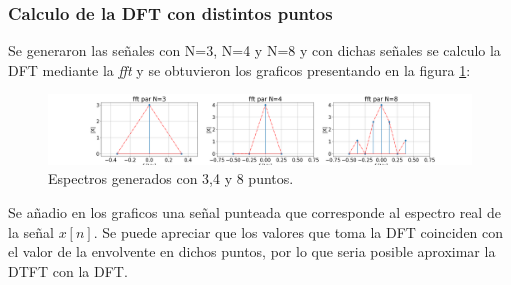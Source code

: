 \documentclass[letterpaper]{article}
\begin{document}
    
\subsubsection{Calculo de la DFT con distintos puntos}    
Se generaron las señales con N=3, N=4 y N=8 y con dichas señales se calculo la DFT mediante la \textit{fft} y se obtuvieron los graficos presentando en la figura \ref{fig.3b}:

\begin{figure}[htb]
\centering
\includegraphics[width=\textwidth]{Img/punto_3_b.png}
\caption{Espectros generados con 3,4 y 8 puntos.}
\label{fig.3b}
\end{figure}

Se añadio en los graficos una señal punteada que corresponde al espectro real de la señal $x[n]$.
Se puede apreciar que los valores que toma la DFT coinciden con el valor de la envolvente en dichos puntos, por lo que seria posible aproximar la DTFT con la DFT.
\end{document}
